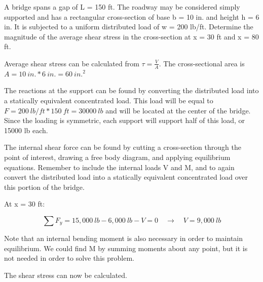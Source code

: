 \documentclass[
  letterpaper,
  DIV=11,
  numbers=noendperiod]{scrreprt}
\theoremstyle{definition}
\theoremstyle{remark}
\begin{document}
\begin{tcolorbox}[enhanced jigsaw, leftrule=.75mm, colbacktitle=quarto-callout-tip-color!10!white, breakable, opacityback=0, colback=white, titlerule=0mm, toprule=.15mm, colframe=quarto-callout-tip-color-frame, coltitle=black, title={Example 2.3}, toptitle=1mm, bottomrule=.15mm, rightrule=.15mm, left=2mm, arc=.35mm, opacitybacktitle=0.6, bottomtitle=1mm]

A bridge spans a gap of L = 150 ft. The roadway may be considered simply
supported and has a rectangular cross-section of base b = 10 in. and
height h = 6 in. It is subjected to a uniform distributed load of w =
200 lb/ft. Determine the magnitude of the average shear stress in the
cross-section at x = 30 ft and x = 80 ft.

\begin{tcolorbox}[enhanced jigsaw, leftrule=.75mm, colbacktitle=quarto-callout-tip-color!10!white, breakable, opacityback=0, colback=white, titlerule=0mm, toprule=.15mm, colframe=quarto-callout-tip-color-frame, coltitle=black, title={Solution}, toptitle=1mm, bottomrule=.15mm, rightrule=.15mm, left=2mm, arc=.35mm, opacitybacktitle=0.6, bottomtitle=1mm]

Average shear stress can be calculated from \(\tau=\frac{V}{A}\). The
cross-sectional area is \(A=10{~in.}*6{~in.}=60{~in.}^2\)

The reactions at the support can be found by converting the distributed
load into a statically equivalent concentrated load. This load will be
equal to \(F=200{~lb/ft}*150{~ft}=30000{~lb}\) and will be located at
the center of the bridge. Since the loading is symmetric, each support
will support half of this load, or 15000 lb each.

The internal shear force can be found by cutting a cross-section through
the point of interest, drawing a free body diagram, and applying
equilibrium equations. Remember to include the internal loads V and M,
and to again convert the distributed load into a statically equivalent
concentrated load over this portion of the bridge.

At x = 30 ft:

\[
\sum F_y=15,000{~lb}-6,000{~lb}-V=0 \quad \rightarrow \quad V=9,000{~lb}
\]

Note that an internal bending moment is also necessary in order to
maintain equilibrium. We could find M by summing moments about any
point, but it is not needed in order to solve this problem.

The shear stress can now be calculated.


\end{tcolorbox}
\end{tcolorbox}
\end{document}
